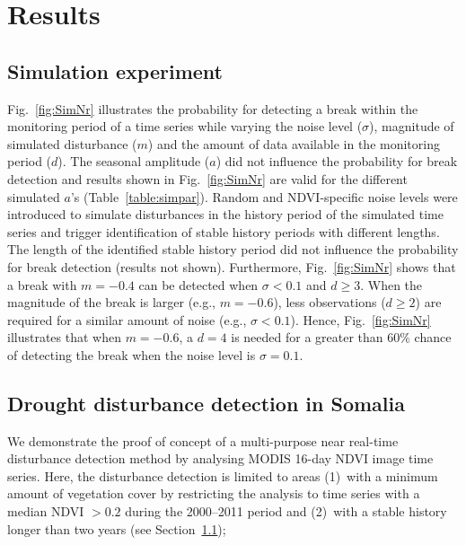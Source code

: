 \documentclass[authoryear,preprint,review,10pt]{elsarticle}
\begin{document}
\section{Results}

\subsection{Simulation experiment} \label{sec:DiscSim}

Fig.~\ref{fig:SimNr} illustrates the probability for detecting a break within the monitoring period of a time series while varying the noise level ($\sigma$), magnitude of simulated disturbance ($m$) and the amount of data available in the monitoring period ($d$). The seasonal amplitude ($a$) did not influence the probability for break detection and results shown in Fig.~\ref{fig:SimNr}  are valid for the different simulated $a$'s (Table~\ref{table:simpar}). 
Random and NDVI-specific noise levels were introduced to simulate disturbances in the history period of the simulated time series and trigger identification
of stable history periods with different lengths. The length of the identified stable history period did not influence the probability for break detection
(results not shown). Furthermore, Fig.~\ref{fig:SimNr} shows that a break with $m = -0.4$ can be detected when $\sigma < 0.1$ and $d  \geq 3$.  When the
magnitude of the break is larger (e.g., $m = -0.6$), less observations ($d \geq 2$) are required for a similar amount of noise (e.g., $\sigma < 0.1$). Hence,
Fig.~\ref{fig:SimNr} illustrates that when $m = -0.6$, a $d=4$ is needed for a greater than $60\%$ chance of detecting the break when the noise level is
$\sigma = 0.1$.



\subsection{Drought disturbance detection in Somalia} \label{sec:DiscReal}

We demonstrate the proof of concept of a multi-purpose near real-time disturbance detection method by analysing MODIS 16-day NDVI image time series. Here, the disturbance detection is limited to areas (1)~with a minimum amount of vegetation cover by restricting the analysis to time series with a median NDVI $>0.2$ during the 2000--2011 period \citep{Vrieling:2011da} and (2)~with a stable history longer than two years (see Section~\ref{sec:DiscSim});
\end{document}
